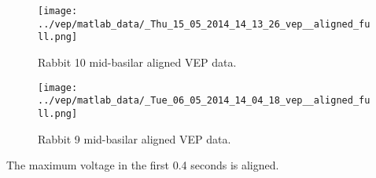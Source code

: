 \documentclass[]{article}
\begin{document}
\begin{figure}[H]
\begin{center}
\texttt{[image: ../vep/matlab\_data/\_Thu\_15\_05\_2014\_14\_13\_26\_vep\_\_aligned\_full.png]}
\caption{Rabbit 10 mid-basilar aligned VEP data.}
\end{center}
\end{figure}

\begin{figure}[H]
\begin{center}
\texttt{[image: ../vep/matlab\_data/\_Tue\_06\_05\_2014\_14\_04\_18\_vep\_\_aligned\_full.png]}
\caption{Rabbit 9 mid-basilar aligned VEP data.}
\end{center}
\end{figure}

The maximum voltage in the first 0.4 seconds is aligned.
\end{document}
